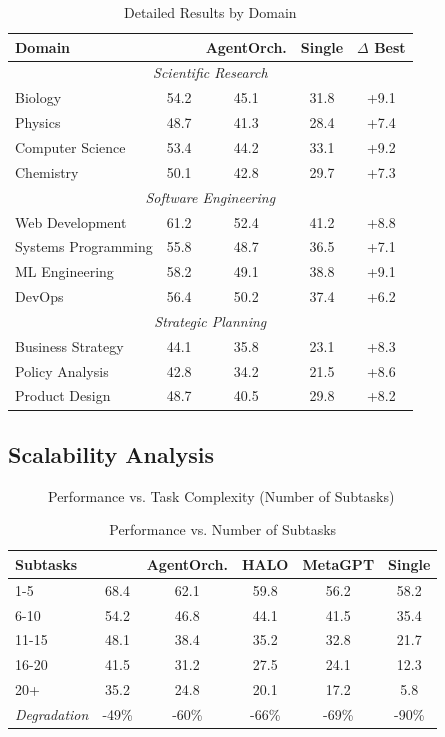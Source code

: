 \documentclass{article}
\theoremstyle{plain}
\theoremstyle{definition}
\theoremstyle{remark}
\begin{document}
\begin{table}[H]
	\caption{Detailed \mars{} Results by Domain}
	\centering
	\small
	\begin{tabular}{@{}lcccc@{}}
		\toprule
		\textbf{Domain} & \textbf{\amore{}} & \textbf{AgentOrch.} & \textbf{Single} & \textbf{$\Delta$ Best} \\
		\midrule
		\multicolumn{5}{c}{\textit{Scientific Research}} \\
		\midrule
		Biology & 54.2 & 45.1 & 31.8 & +9.1 \\
		Physics & 48.7 & 41.3 & 28.4 & +7.4 \\
		Computer Science & 53.4 & 44.2 & 33.1 & +9.2 \\
		Chemistry & 50.1 & 42.8 & 29.7 & +7.3 \\
		\midrule
		\multicolumn{5}{c}{\textit{Software Engineering}} \\
		\midrule
		Web Development & 61.2 & 52.4 & 41.2 & +8.8 \\
		Systems Programming & 55.8 & 48.7 & 36.5 & +7.1 \\
		ML Engineering & 58.2 & 49.1 & 38.8 & +9.1 \\
		DevOps & 56.4 & 50.2 & 37.4 & +6.2 \\
		\midrule
		\multicolumn{5}{c}{\textit{Strategic Planning}} \\
		\midrule
		Business Strategy & 44.1 & 35.8 & 23.1 & +8.3 \\
		Policy Analysis & 42.8 & 34.2 & 21.5 & +8.6 \\
		Product Design & 48.7 & 40.5 & 29.8 & +8.2 \\
		\bottomrule
	\end{tabular}
\end{table}


\subsection{Scalability Analysis}
\begin{figure}[t]
	\centering
	
	\caption{ Performance vs. Task Complexity (Number of Subtasks)}
	\label{fig:framework9}
\end{figure}

\begin{table}[H]
	\caption{Performance vs. Number of Subtasks}
	\centering
	\small
	\begin{tabular}{@{}lccccc@{}}
		\toprule
		\textbf{Subtasks} & \textbf{\amore{}} & \textbf{AgentOrch.} & \textbf{HALO} & \textbf{MetaGPT} & \textbf{Single} \\
		\midrule
		1-5 & 68.4 & 62.1 & 59.8 & 56.2 & 58.2 \\
		6-10 & 54.2 & 46.8 & 44.1 & 41.5 & 35.4 \\
		11-15 & 48.1 & 38.4 & 35.2 & 32.8 & 21.7 \\
		16-20 & 41.5 & 31.2 & 27.5 & 24.1 & 12.3 \\
		20+ & 35.2 & 24.8 & 20.1 & 17.2 & 5.8 \\
		\midrule
		\textit{Degradation} & -49\% & -60\% & -66\% & -69\% & -90\% \\
		\bottomrule
	\end{tabular}
\end{table}
\end{document}
